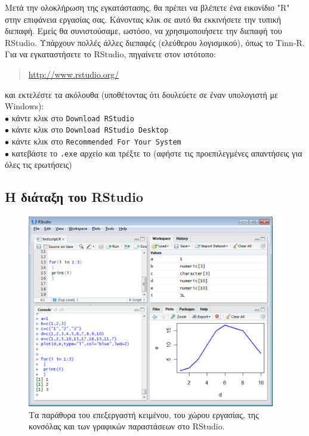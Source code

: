 \documentclass[a4paper,10pt,twocolumn]{article}
\makeatletter
\let\SF@@footnote\footnote
\def\footnote{\ifx\protect\@typeset@protect
 \expandafter\SF@@footnote
 \else
 \expandafter\SF@gobble@opt
 \fi
}
\edef\SF@gobble@opt{\noexpand\protect
 \expandafter\noexpand\csname SF@gobble@opt \endcsname}
\makeatother
\begin{document}
Μετά την ολοκλήρωση της εγκατάστασης, θα πρέπει να βλέπετε ένα εικονίδιο "R" στην επιφάνεια
εργασίας σας. Κάνοντας κλικ σε αυτό θα εκκινήσετε την τυπική διεπαφή. Εμείς θα συνιστούσαμε,
ωστόσο, να χρησιμοποιήσετε την διεπαφή του RStudio. \footnote{Υπάρχουν πολλές άλλες διεπαφές
(ελεύθερου λογισμικού), όπως το Tinn-R.} Για να εγκαταστήσετε το RStudio, πηγαίνετε στον ιστότοπο: 
\begin{quote}
  \url{http://www.rstudio.org/}
\end{quote}
και εκτελέστε τα ακόλουθα (υποθέτοντας ότι δουλεύετε σε έναν υπολογιστή με Windows):\\
\noindent $\bullet$ κάντε κλικ στο \texttt{Download RStudio}\\
\noindent $\bullet$ κάντε κλικ στο \texttt{Download RStudio Desktop}\\
\noindent $\bullet$ κάντε κλικ στο \texttt{Recommended For Your System}\\
\noindent $\bullet$ κατεβάστε το \texttt{.exe} αρχείο και τρέξτε το 
(αφήστε τις προεπιλεγμένες απαντήσεις για όλες τις ερωτήσεις)

\subsection{Η διάταξη του RStudio}

\begin{figure}[htb]
  \centering
  \includegraphics[width=13cm, clip=true, trim=0cm 0cm 9mm 0cm]{img/rstudio_screenshot.pdf}
  \caption{Τα παράθυρα του επεξεργαστή κειμένου, του χώρου εργασίας, της κονσόλας και των γραφικών
  παραστάσεων στο RStudio.}
  \label{fig:screenshot}
\end{figure}
\end{document}

